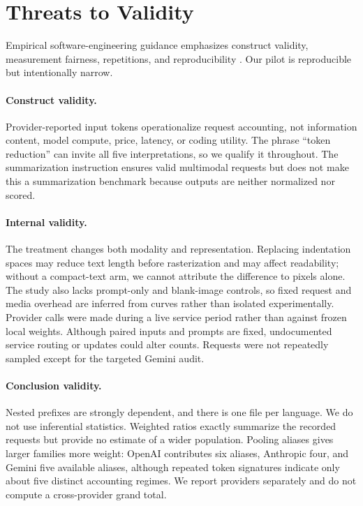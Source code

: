 \documentclass[sigconf,nonacm]{acmart}
\begin{document}
\section{Threats to Validity}

Empirical software-engineering guidance emphasizes construct validity,
measurement fairness, repetitions, and reproducibility
\cite{ralph_2021_empirical}. Our pilot is reproducible but intentionally narrow.

\paragraph{Construct validity.}
Provider-reported input tokens operationalize request accounting, not
information content, model compute, price, latency, or coding utility. The
phrase ``token reduction'' can invite all five interpretations, so we qualify it
throughout. The summarization instruction ensures valid multimodal requests but
does not make this a summarization benchmark because outputs are neither
normalized nor scored.

\paragraph{Internal validity.}
The treatment changes both modality and representation. Replacing indentation
spaces may reduce text length before rasterization and may affect readability;
without a compact-text arm, we cannot attribute the difference to pixels alone.
The study also lacks prompt-only and blank-image controls, so fixed request and
media overhead are inferred from curves rather than isolated experimentally.
Provider calls were made during a live service period rather than against frozen
local weights. Although paired inputs and prompts are fixed, undocumented
service routing or updates could alter counts. Requests were not repeatedly
sampled except for the targeted Gemini audit.

\paragraph{Conclusion validity.}
Nested prefixes are strongly dependent, and there is one file per language.
We do not use inferential statistics. Weighted ratios exactly summarize
the recorded requests but provide no estimate of a wider population. Pooling
aliases gives larger families more weight: OpenAI contributes six aliases,
Anthropic four, and Gemini five available aliases, although repeated token
signatures indicate only about five distinct accounting regimes. We report
providers separately and do not compute a cross-provider grand total.
\end{document}

